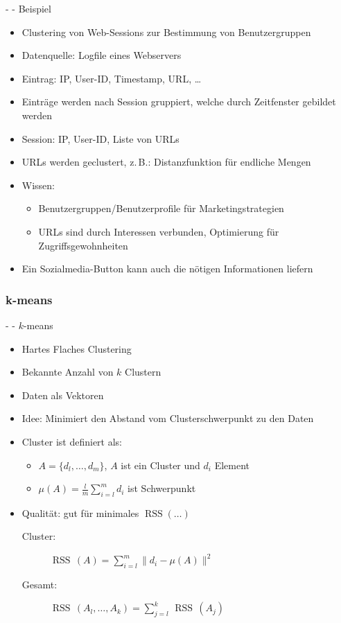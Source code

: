 \documentclass[fleqn,11pt,aspectratio=43]{beamer}
\DeclareMathOperator{\RSS}{RSS}
\begin{document}
\begin{frame}{\insertsectionhead - \insertsubsectionhead - Beispiel \cite{ester2000knowledge}}
\begin{itemize} %
\item Clustering von Web-Sessions zur Bestimmung von Benutzergruppen
\item Datenquelle: Logfile eines Webservers
\item Eintrag: IP, User-ID, Timestamp, URL, \ldots
\item Einträge werden nach Session gruppiert, welche durch Zeitfenster gebildet werden
\item Session: IP, User-ID, Liste von URLs
\item URLs werden geclustert, z.\,B.: Distanzfunktion für endliche Mengen
\item Wissen:
\begin{itemize}
\item Benutzergruppen/Benutzerprofile für Marketingstrategien 
\item URLs sind durch Interessen verbunden, Optimierung für Zugriffsgewohnheiten 
\end{itemize}
\item Ein Sozialmedia-Button kann auch die nötigen Informationen liefern
\end{itemize}
\end{frame}


\subsubsection{k-means~}\label{kmeans}

\begin{frame}{\insertsectionhead - \insertsubsectionhead - $k$-means \cite{dwh}}
\begin{itemize}
\item Hartes Flaches Clustering
\item Bekannte Anzahl von $k$ Clustern
\item Daten als Vektoren
\item Idee: Minimiert den Abstand vom Clusterschwerpunkt zu den Daten
\item Cluster ist definiert als:
\begin{itemize}
\item $A = \{d_l, \ldots, d_m\}$, $A$ ist ein Cluster und $d_i$ Element 
\item $\mu(A) = \frac{l}{m}\sum\limits_{i=l}^{m}{d_i}$ ist Schwerpunkt
\end{itemize}
\item Qualität: gut für minimales $\RSS(\ldots)$
\begin{description}
\item[Cluster:] $\RSS\,(A) = \sum\limits_{i=l}^{m}\big\|d_i - \mu(A)\big\|^2$
\item[Gesamt:] $\RSS\,(A_l, \ldots, A_k) = \sum\limits_{j=l}^{k}\,\RSS\,(A_j)$
\end{description}
\end{itemize}
\end{frame}
\end{document}
